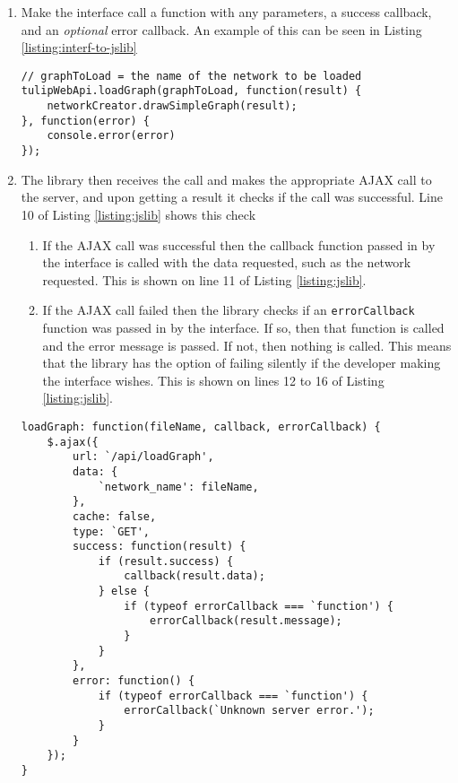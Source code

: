\documentclass[../dissertation.tex]{subfiles}
\begin{document}
\begin{enumerate}
    \item Make the interface call a function with any parameters, a success callback, and an \emph{optional} error callback. An example of this can be seen in Listing \ref{listing:interf-to-jslib}
    
    \begin{lstlisting}[caption=How the interface would call the JavaScript library, label=listing:interf-to-jslib]
// graphToLoad = the name of the network to be loaded
tulipWebApi.loadGraph(graphToLoad, function(result) {
	networkCreator.drawSimpleGraph(result);
}, function(error) {
	console.error(error)
});
    \end{lstlisting}
    
    \item The library then receives the call and makes the appropriate AJAX call to the server, and upon getting a result it checks if the call was successful. Line 10 of Listing \ref{listing:jslib} shows this check
    \begin{enumerate}
        \item If the AJAX call was successful then the callback function passed in by the interface is called with the data requested, such as the network requested. This is shown on line 11 of Listing \ref{listing:jslib}.
        \item If the AJAX call failed then the library checks if an \texttt{errorCallback} function was passed in by the interface. If so, then that function is called and the error message is passed. If not, then nothing is called. This means that the library has the option of failing silently if the developer making the interface wishes. This is shown on lines 12 to 16 of Listing \ref{listing:jslib}.
    \end{enumerate}
    
    \begin{lstlisting}[caption=How the JavaScript library catches and passes errors, label=listing:jslib]
loadGraph: function(fileName, callback, errorCallback) {
	$.ajax({
		url: `/api/loadGraph',
		data: {
	        `network_name': fileName,
	    },
	    cache: false,
	    type: `GET',
		success: function(result) {
			if (result.success) {
        		callback(result.data);
			} else {
				if (typeof errorCallback === `function') {
					errorCallback(result.message);
				}
			}
        },
		error: function() {
			if (typeof errorCallback === `function') {
				errorCallback(`Unknown server error.');
			}
        }
    });
}
    \end{lstlisting}

\end{enumerate}
\end{document}

